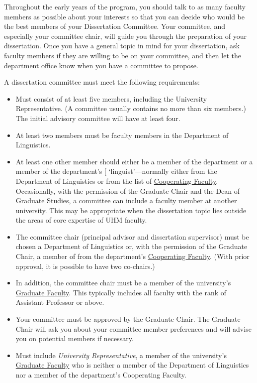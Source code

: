 \documentclass[
]{book}
\providecommand{\tightlist}{%
  \setlength{\itemsep}{0pt}\setlength{\parskip}{0pt}}
\begin{document}
Throughout the early years of the program, you should talk to as many faculty members as possible about your interests so that you can decide who would be the best members of your Dissertation Committee. Your committee, and especially your committee chair, will guide you through the preparation of your dissertation. Once you have a general topic in mind for your dissertation, ask faculty members if they are willing to be on your committee, and then let the department office know when you have a committee to propose.

A dissertation committee must meet the following requirements:

\begin{itemize}
\tightlist
\item
  Must consist of at least five members, including the University Representative. (A committee usually contains no more than six members.) The initial advisory committee will have at least four.
\item
  At least two members must be faculty members in the Department of Linguistics.
\item
  At least one other member should either be a member of the department or a member of the department's {[} `linguist'---normally either from the Department of Linguistics or from the list of \href{http://ling.hawaii.edu/full-graduate-faculty-in-other-departments/}{Cooperating Faculty}. Occasionally, with the permission of the Graduate Chair and the Dean of Graduate Studies, a committee can include a faculty member at another university. This may be appropriate when the dissertation topic lies outside the areas of core expertise of UHM faculty.\\
\item
  The committee chair (principal advisor and dissertation supervisor) must be chosen a Department of Linguistics or, with the permission of the Graduate Chair, a member of from the department's \href{http://ling.hawaii.edu/full-graduate-faculty-in-other-departments/}{Cooperating Faculty}. (With prior approval, it is possible to have two co-chairs.)
\item
  In addition, the committee chair must be a member of the university's \href{http://manoa.hawaii.edu/graduate/content/select-committee-member}{Graduate Faculty}. This typically includes all faculty with the rank of Assistant Professor or above.
\item
  Your committee must be approved by the Graduate Chair. The Graduate Chair will ask you about your committee member preferences and will advise you on potential members if necessary.
\item
  Must include \emph{University Representative}, a member of the university's \href{http://manoa.hawaii.edu/graduate/content/select-committee-member}{Graduate Faculty} who is neither a member of the Department of Linguistics nor a member of the department's Cooperating Faculty.
\end{itemize}
\end{document}
